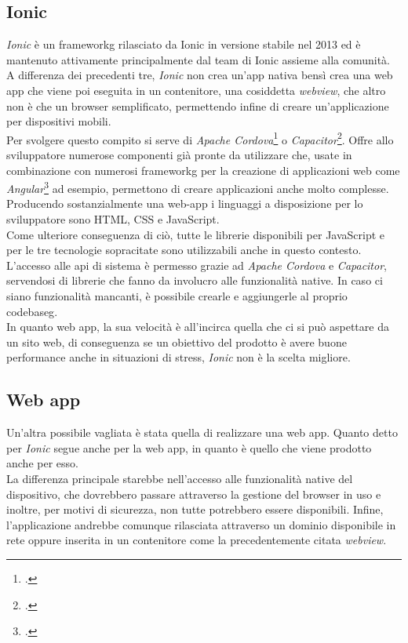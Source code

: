 \subsection{Ionic}
\label{subsec:ionic}

\emph{Ionic} è un \gls{frameworkg} rilasciato da Ionic in versione stabile nel 2013 ed è mantenuto attivamente principalmente dal team di Ionic assieme alla comunità.\\
A differenza dei precedenti tre, \emph{Ionic} non crea un'app nativa bensì crea una web app che viene poi eseguita in un contenitore, una cosiddetta \emph{webview}, che altro non è che un browser semplificato, permettendo infine di creare un'applicazione per dispositivi mobili.\\
Per svolgere questo compito si serve di \emph{Apache Cordova}\footcite{site:apache-cordova} o \emph{Capacitor}\footcite{site:capacitor}.
Offre allo sviluppatore numerose componenti già pronte da utilizzare che, usate in combinazione con numerosi \gls{frameworkg} per la creazione di applicazioni web come \emph{Angular}\footcite{site:angular} ad esempio, permettono di creare applicazioni anche molto complesse.\\
Producendo sostanzialmente una web-app i linguaggi a disposizione per lo sviluppatore sono HTML, CSS e JavaScript.\\
Come ulteriore conseguenza di ciò, tutte le librerie disponibili per JavaScript e per le tre tecnologie sopracitate sono utilizzabili anche in questo contesto.\\
L'accesso alle \gls{api} di sistema è permesso grazie ad \emph{Apache Cordova} e \emph{Capacitor}, servendosi di librerie che fanno da involucro alle funzionalità native. In caso ci siano funzionalità mancanti, è possibile crearle e aggiungerle al proprio \gls{codebaseg}.\\
In quanto web app, la sua velocità è all'incirca quella che ci si può aspettare da un sito web, di conseguenza se un obiettivo del prodotto è avere buone performance anche in situazioni di stress, \emph{Ionic} non è la scelta migliore.

\subsection{Web app}
\label{subsec:web-app}

Un'altra possibile vagliata è stata quella di realizzare una web app. Quanto detto per \emph{Ionic} segue anche per la web app, in quanto è quello che viene prodotto anche per esso.\\
La differenza principale starebbe nell'accesso alle funzionalità native del dispositivo, che dovrebbero passare attraverso la gestione del browser in uso e inoltre, per motivi di sicurezza, non tutte potrebbero essere disponibili.
Infine, l'applicazione andrebbe comunque rilasciata attraverso un dominio disponibile in rete oppure inserita in un contenitore come la precedentemente citata \emph{webview}.
